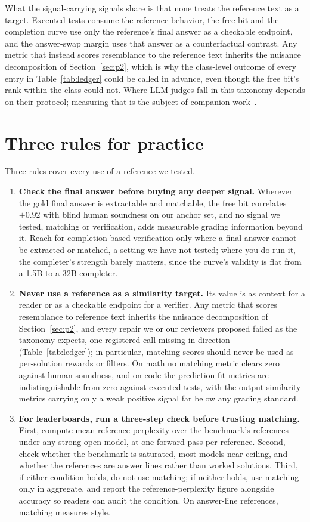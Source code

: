 \documentclass[11pt]{article}
\begin{document}
What the signal-carrying signals share is that none treats the reference text as a target.
Executed tests consume the reference behavior, the free bit and the completion curve use only the reference's final answer as a checkable endpoint, and the answer-swap margin uses that answer as a counterfactual contrast.
Any metric that instead scores resemblance to the reference text inherits the nuisance decomposition of Section~\ref{sec:p2}, which is why the class-level outcome of every entry in Table~\ref{tab:ledger} could be called in advance, even though the free bit's rank within the class could not.
Where LLM judges fall in this taxonomy depends on their protocol; measuring that is the subject of companion work~\cite{companionA}.

\section{Three rules for practice}
\label{sec:rules}

Three rules cover every use of a reference we tested.
\begin{enumerate}
\item \textbf{Check the final answer before buying any deeper signal.}
Wherever the gold final answer is extractable and matchable, the free bit correlates $+0.92$ with blind human soundness on our anchor set, and no signal we tested, matching or verification, adds measurable grading information beyond it.
Reach for completion-based verification only where a final answer cannot be extracted or matched, a setting we have not tested; where you do run it, the completer's strength barely matters, since the curve's validity is flat from a 1.5B to a 32B completer.
\item \textbf{Never use a reference as a similarity target.}
Its value is as context for a reader or as a checkable endpoint for a verifier.
Any metric that scores resemblance to reference text inherits the nuisance decomposition of Section~\ref{sec:p2}, and every repair we or our reviewers proposed failed as the taxonomy expects, one registered call missing in direction (Table~\ref{tab:ledger}); in particular, matching scores should never be used as per-solution rewards or filters.
On math no matching metric clears zero against human soundness, and on code the prediction-fit metrics are indistinguishable from zero against executed tests, with the output-similarity metrics carrying only a weak positive signal far below any grading standard.
\item \textbf{For leaderboards, run a three-step check before trusting matching.}
First, compute mean reference perplexity over the benchmark's references under any strong open model, at one forward pass per reference.
Second, check whether the benchmark is saturated, most models near ceiling, and whether the references are answer lines rather than worked solutions.
Third, if either condition holds, do not use matching; if neither holds, use matching only in aggregate, and report the reference-perplexity figure alongside accuracy so readers can audit the condition.
On answer-line references, matching measures style.
\end{enumerate}
\end{document}
